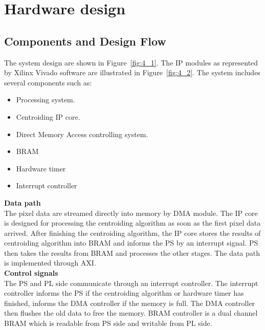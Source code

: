 \section{Hardware design}

\subsection{Components and Design Flow}

The system design are shown in Figure~\ref{fig:4_1}. The IP modules as represented by Xilinx Vivado software are illustrated in Figure~\ref{fig:4_2}. The system includes several components such as:
\begin{itemize}
    \item Processing system.
    \item Centroiding IP core.
    \item Direct Memory Access controlling system.
    \item BRAM
    \item Hardware timer
    \item Interrupt controller
\end{itemize}


\noindent \textbf{Data path} \\
\noindent The pixel data are streamed directly into memory by DMA module. The IP core is designed for processing the centroiding algorithm as soon as the first pixel data arrived. After finishing the centroiding algorithm, the IP core stores the results of centroiding algorithm into BRAM and informs the PS by an interrupt signal. PS then takes the results from BRAM and processes the other stages. The data path is implemented through AXI. \\

\noindent \textbf{Control signals} \\
\noindent The PS and PL side communicate through an interrupt controller. The interrupt controller informs the PS if the centroiding algorithm or hardware timer has finished, informs the DMA controller if the memory is full. The DMA controller then flushes the old data to free the memory. BRAM controller is a dual channel BRAM which is readable from PS side and writable from PL side. \\

